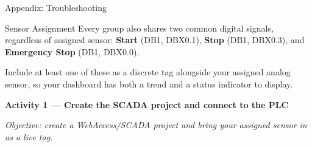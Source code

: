 \begin{labsection}{Appendix: Troubleshooting}{}
\begin{labsection}{Sensor Assignment}{}
    Every group also shares two common digital signals, regardless of assigned sensor: \textbf{Start} (DB1, DBX0.1), \textbf{Stop} (DB1, DBX0.3), and \textbf{Emergency Stop} (DB1, DBX0.0).

    Include at least one of these as a discrete tag alongside your assigned analog sensor, so your dashboard has both a trend and a status indicator to display.
  \end{labsection}

  \begin{procedure}

    \textbf{Activity 1 --- Create the SCADA project and connect to the PLC}\vspace{2pt}

    \textit{Objective: create a WebAccess/SCADA project and bring your assigned sensor in as a live tag.}


\end{procedure}
\end{labsection}
